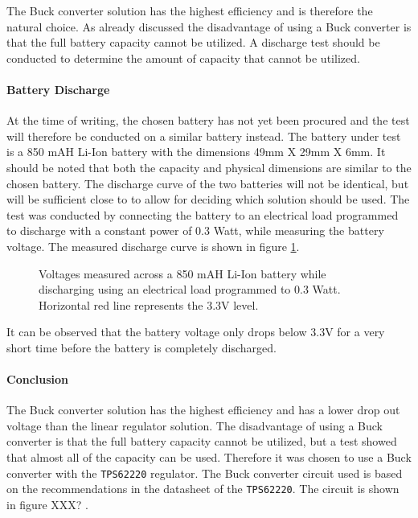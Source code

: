 The Buck converter solution has the highest efficiency and is therefore the natural choice.
As already discussed the disadvantage of using a Buck converter is that the full battery capacity cannot be utilized.
A discharge test should be conducted to determine the amount of capacity that cannot be utilized.


\paragraph{Battery Discharge}
At the time of writing, the chosen battery has not yet been procured and the test will therefore be conducted on a similar battery instead.
The battery under test is a 850 mAH Li-Ion battery with the dimensions 49mm X 29mm X 6mm.
It should be noted that both the capacity and physical dimensions are similar to the chosen battery.
The discharge curve of the two batteries will not be identical, but will be sufficient close to to allow for deciding which solution should be used.
The test was conducted by connecting the battery to an electrical load programmed to discharge with a constant power of 0.3 Watt, while measuring the battery voltage.
The measured discharge curve is shown in figure \ref{fig:bat_discharge}.

\begin{figure}[h]
	\centering
    
	\caption{Voltages measured across a 850 mAH Li-Ion battery while discharging using an electrical load programmed to 0.3 Watt. Horizontal red line represents the 3.3V level.}
	\label{fig:bat_discharge}
\end{figure}
It can be observed that the battery voltage only drops below 3.3V for a very short time before the battery is completely discharged.

\paragraph{Conclusion}
The Buck converter solution has the highest efficiency and has a lower drop out voltage than the linear regulator solution.
The disadvantage of using a Buck converter is that the full battery capacity cannot be utilized, but a test showed that almost all of the capacity can be used.
Therefore it was chosen to use a Buck converter with the \texttt{TPS62220} regulator. 
The Buck converter circuit used is based on the recommendations in the datasheet of the \texttt{TPS62220}.
The circuit is shown in figure XXX? .
